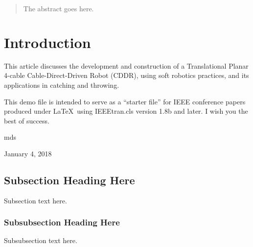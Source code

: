 \documentclass[conference]{IEEEtran}
\begin{document}
	
	
	
	
	
	
	
	\maketitle
	
	\begin{abstract}
		The abstract goes here.
	\end{abstract}
	
	
	
	
	
	\IEEEpeerreviewmaketitle
	
	
	
	\section{Introduction}
	This article discusses the development and construction of a Translational Planar 4-cable Cable-Direct-Driven Robot (CDDR), using soft robotics practices, and its applications in catching and throwing. 
	
	
	This demo file is intended to serve as a ``starter file''
	for IEEE conference papers produced under \LaTeX\ using
	IEEEtran.cls version 1.8b and later.
	I wish you the best of success.
	
	\hfill mds
	
	\hfill January 4, 2018
	
	\subsection{Subsection Heading Here}
	Subsection text here.
	
	
	\subsubsection{Subsubsection Heading Here}
	Subsubsection text here.
	
\end{document}
